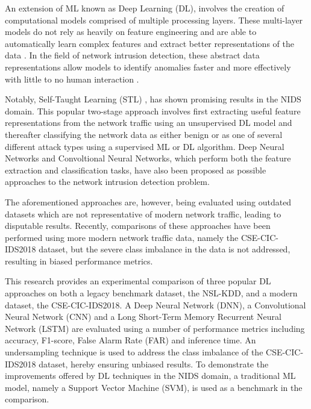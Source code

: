 \documentclass[conference]{IEEEtran}
\begin{document}
An extension of ML known as Deep Learning (DL), involves the creation of computational models comprised of multiple processing layers. These multi-layer models do not rely as heavily on feature engineering and are able to automatically learn complex features and extract better representations of the data \cite{b8}. In the field of network intrusion detection, these abstract data representations allow models to identify anomalies faster and more effectively with little to no human interaction \cite{b10}.


Notably, Self-Taught Learning (STL) \cite{b2}, has shown promising results in the NIDS domain. This popular two-stage approach involves first extracting useful feature representations from the network traffic using an unsupervised DL model and thereafter classifying the network data as either benign or as one of several different attack types using a supervised ML or DL algorithm. Deep Neural Networks and Convoltional Neural Networks, which perform both the feature extraction and classification tasks, have also been proposed as possible approaches to the network intrusion detection problem.

The aforementioned approaches are, however, being evaluated using outdated datasets which are not representative of modern network traffic, leading to disputable results. Recently, comparisons of these approaches have been performed using more modern network traffic data, namely the CSE-CIC-IDS2018 dataset, but the severe class imbalance in the data is not addressed, resulting in biased performance metrics. 

This research provides an experimental comparison of three popular DL approaches on both a legacy benchmark dataset, the NSL-KDD, and a modern dataset, the CSE-CIC-IDS2018. A Deep Neural Network (DNN), a Convolutional Neural Network (CNN) and a Long Short-Term Memory Recurrent Neural Network (LSTM) are evaluated using a number of performance metrics including accuracy, F1-score, False Alarm Rate (FAR) and inference time. An undersampling technique is used to address the class imbalance of the CSE-CIC-IDS2018 dataset, hereby ensuring unbiased results. To demonstrate the improvements offered by DL techniques in the NIDS domain, a traditional ML model, namely a Support Vector Machine (SVM),  is used as a benchmark in the comparison.
\end{document}
